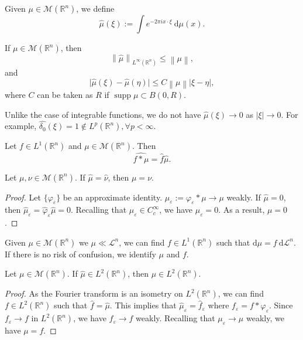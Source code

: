Given $\mu \in \mathcal{M}(\mathbb{R}^{n})$, we define
$$\hat{\mu}(\xi):=\int e^{-2\pi ix\cdot \xi}\ \mathrm{d}\mu(x).$$

\begin{proposition}\label{prop:2.3}
If $\mu \in \mathcal{M}(\mathbb{R}^{n})$, then
$$
\left\| \hat{\mu} \right\| _{L^{\infty}(\mathbb{R}^{n})}\leq \left\| \mu \right\| ,
$$
and
$$
\lvert \hat{\mu}(\xi)-\hat{\mu}(\eta) \rvert \leq C\left\| \mu \right\| \lvert \xi-\eta \rvert ,
$$
where $C$ can be taken as $R$ if $\operatorname{supp} \mu \subset B(0,R).$
\end{proposition}

\begin{remark}\label{rmk:measure_decay}
Unlike the case of integrable functions, we do not have $\hat{\mu}(\xi)\to 0$ as $\lvert \xi \rvert\to 0$. For example, $\hat{\delta_{0}}(\xi)=1\notin L^{p}(\mathbb{R}^{n}), \forall p<\infty$.
\end{remark}

\begin{proposition}\label{prop:2.4}
Let $f \in L^{1}(\mathbb{R}^{n})$ and $\mu \in \mathcal{M}(\mathbb{R}^{n})$. Then
$$
\widehat{f*\mu}=\hat{f}\hat{\mu}.
$$
\end{proposition}

\begin{lemma}\label{lem:2.5}
Let $\mu,\nu \in \mathcal{M}(\mathbb{R}^{n})$. If $\hat{\mu}=\hat{\nu}$, then $\mu=\nu$.
\end{lemma}
\begin{proof}
Let $\{ \varphi _{\varepsilon} \}$ be an approximate identity. $\mu _{\varepsilon}:=\varphi _{\varepsilon}*\mu\to \mu$ weakly. If $\hat{\mu}=0$, then $\hat{\mu}_{\varepsilon}=\hat{\varphi}_{\varepsilon}\hat{\mu}=0$. Recalling that $\mu _{\varepsilon}\in C_{c}^{\infty}$, we have $\mu _{\varepsilon}=0$. As a result, $\mu=0$.
\end{proof}

Given $\mu \in \mathcal{M}(\mathbb{R}^{n})$ we $\mu \ll \mathcal{L}^{n}$, we can find $f \in L^{1}(\mathbb{R}^{n})$ such that $\mathrm{d}\mu=f\ \mathrm{d}\mathcal{L}^{n}$. If there is no risk of confusion, we identify $\mu$ and $f$.

\begin{theorem}\label{thm:2.6}
Let $\mu \in \mathcal{M}(\mathbb{R}^{n})$. If $\hat{\mu}\in L^{2}(\mathbb{R}^{n})$, then $\mu \in L^{2}(\mathbb{R}^{n})$.
\end{theorem}
\begin{proof}
As the Fourier transform is an isometry on $L^{2}(\mathbb{R}^{n})$, we can find $f \in L^{2}(\mathbb{R}^{n})$ such that $\hat{f}=\hat{\mu}.$ This implies that $\hat{\mu}_{\varepsilon}=\hat{f}_{\varepsilon}$ where $f_{\varepsilon}=f*\varphi _{\varepsilon}$. Since $f_{\varepsilon}\to f$ in $L^{2}(\mathbb{R}^{n})$, we have $f_{\varepsilon}\to f$ weakly. Recalling that $\mu _{\varepsilon}\to \mu$ weakly, we have $\mu=f$.
\end{proof}

